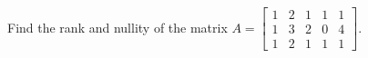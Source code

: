 Find the rank and nullity of the matrix 
$A = \begin{bmatrix} 
1 & 2 & 1 & 1 & 1\\ 
1 & 3 & 2 & 0 & 4\\ 
1 & 2 & 1 & 1 & 1 
\end{bmatrix}$.
